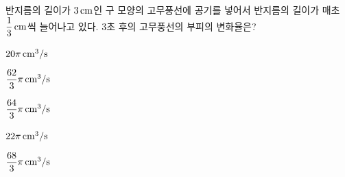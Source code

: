 반지름의 길이가 $3\mkern3mu \mathrm{cm}$인 구 모양의 고무풍선에 공기를 넣어서 반지름의 길이가 매초 $\dfrac{1}{3}\mkern3mu \mathrm{cm}$씩 늘어나고 있다. $3$초 후의 고무풍선의 부피의 변화율은?
\begin{choices32}{\rule[-3ex]{0pt}{8ex}$20\pi\mkern3mu \mathrm{cm}^3/\mathrm{s}$}{\rule[-3ex]{0pt}{8ex}$\dfrac{62}{3}\pi\mkern3mu \mathrm{cm}^3/\mathrm{s}$}{\rule[-3ex]{0pt}{8ex}$\dfrac{64}{3}\pi\mkern3mu \mathrm{cm}^3/\mathrm{s}$}{\rule[-3ex]{0pt}{8ex}$22\pi\mkern3mu \mathrm{cm}^3/\mathrm{s}$}{\rule[-3ex]{0pt}{8ex}$\dfrac{68}{3}\pi\mkern3mu \mathrm{cm}^3/\mathrm{s}$}\end{choices32}
